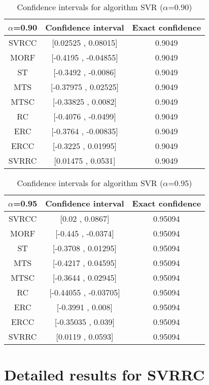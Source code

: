 \documentclass[a4paper,10pt]{article}
\begin{document}
\begin{table}[!htp]
\centering\small
\begin{tabular}{
|c|c|c|}
\hline
 $\alpha$=0.90 & Confidence interval & Exact confidence \\ \hline 
SVRCC & [0.02525 , 0.08015] & 0.9049\\ \hline 
MORF & [-0.4195 , -0.04855] & 0.9049\\ \hline 
ST & [-0.3492 , -0.0086] & 0.9049\\ \hline 
MTS & [-0.37975 , 0.02525] & 0.9049\\ \hline 
MTSC & [-0.33825 , 0.0082] & 0.9049\\ \hline 
RC & [-0.4076 , -0.0499] & 0.9049\\ \hline 
ERC & [-0.3764 , -0.00835] & 0.9049\\ \hline 
ERCC & [-0.3225 , 0.01995] & 0.9049\\ \hline 
SVRRC & [0.01475 , 0.0531] & 0.9049\\ \hline 

\end{tabular}
\caption{Confidence intervals for algorithm SVR ($\alpha$=0.90)}
\end{table}
\begin{table}[!htp]
\centering\small
\begin{tabular}{
|c|c|c|}
\hline
 $\alpha$=0.95 & Confidence interval & Exact confidence \\ \hline 
SVRCC & [0.02 , 0.0867] & 0.95094\\ \hline 
MORF & [-0.445 , -0.0374] & 0.95094\\ \hline 
ST & [-0.3708 , 0.01295] & 0.95094\\ \hline 
MTS & [-0.4217 , 0.04595] & 0.95094\\ \hline 
MTSC & [-0.3644 , 0.02945] & 0.95094\\ \hline 
RC & [-0.44055 , -0.03705] & 0.95094\\ \hline 
ERC & [-0.3991 , 0.008] & 0.95094\\ \hline 
ERCC & [-0.35035 , 0.039] & 0.95094\\ \hline 
SVRRC & [0.0119 , 0.0593] & 0.95094\\ \hline 

\end{tabular}
\caption{Confidence intervals for algorithm SVR ($\alpha$=0.95)}
\end{table}

 \clearpage 


\section{Detailed results for SVRRC}
\end{document}
